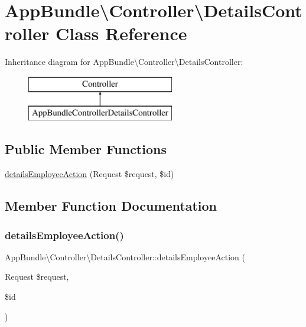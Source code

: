 \hypertarget{class_app_bundle_1_1_controller_1_1_details_controller}{}\section{App\+Bundle\textbackslash{}Controller\textbackslash{}Details\+Controller Class Reference}
\label{class_app_bundle_1_1_controller_1_1_details_controller}
Inheritance diagram for App\+Bundle\textbackslash{}Controller\textbackslash{}Details\+Controller\+:\begin{figure}[H]
\begin{center}
\leavevmode
\includegraphics[height=2.000000cm]{class_app_bundle_1_1_controller_1_1_details_controller}
\end{center}
\end{figure}
\subsection*{Public Member Functions}
\begin{DoxyCompactItemize}
\item 
\mbox{\hyperlink{class_app_bundle_1_1_controller_1_1_details_controller_a48005037a3aa333faf089a31ca04f930}{details\+Employee\+Action}} (Request \$request, \$id)
\end{DoxyCompactItemize}


\subsection{Member Function Documentation}
\mbox{\label{class_app_bundle_1_1_controller_1_1_details_controller_a48005037a3aa333faf089a31ca04f930}} 
\subsubsection{\texorpdfstring{details\+Employee\+Action()}{detailsEmployeeAction()}}
{\footnotesize\ttfamily App\+Bundle\textbackslash{}\+Controller\textbackslash{}\+Details\+Controller\+::details\+Employee\+Action (\begin{DoxyParamCaption}\item[{Request}]{\$request,  }\item[{}]{\$id }\end{DoxyParamCaption})}

